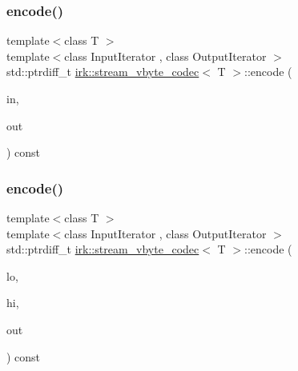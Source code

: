 \mbox{\label{structirk_1_1stream__vbyte__codec_a3547ab2ad7b449c26c96d996f4f7eb21}} 
\subsubsection{\texorpdfstring{encode()}{encode()}\hspace{0.1cm}{\footnotesize\ttfamily [1/2]}}
{\footnotesize\ttfamily template$<$class T $>$ \\
template$<$class Input\+Iterator , class Output\+Iterator $>$ \\
std\+::ptrdiff\+\_\+t \mbox{\hyperlink{structirk_1_1stream__vbyte__codec}{irk\+::stream\+\_\+vbyte\+\_\+codec}}$<$ T $>$\+::encode (\begin{DoxyParamCaption}\item[{Input\+Iterator}]{in,  }\item[{Output\+Iterator}]{out }\end{DoxyParamCaption}) const\hspace{0.3cm}{\ttfamily [inline]}}

\mbox{\label{structirk_1_1stream__vbyte__codec_a6b3223677b8a8bb474ab3845dc199c8d}} 
\subsubsection{\texorpdfstring{encode()}{encode()}\hspace{0.1cm}{\footnotesize\ttfamily [2/2]}}
{\footnotesize\ttfamily template$<$class T $>$ \\
template$<$class Input\+Iterator , class Output\+Iterator $>$ \\
std\+::ptrdiff\+\_\+t \mbox{\hyperlink{structirk_1_1stream__vbyte__codec}{irk\+::stream\+\_\+vbyte\+\_\+codec}}$<$ T $>$\+::encode (\begin{DoxyParamCaption}\item[{Input\+Iterator}]{lo,  }\item[{Input\+Iterator}]{hi,  }\item[{Output\+Iterator}]{out }\end{DoxyParamCaption}) const\hspace{0.3cm}{\ttfamily [inline]}}

